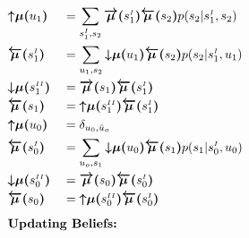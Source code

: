 \documentclass[fleqn]{article}
\begin{document}
\begin{minipage}[t]{0.5\textwidth}
    \begin{alignat}{2}
         & \bm{{\uparrow}{\mu}(}u_1\bm{)}                                      &  & = \sum_{s^{\scriptscriptstyle I}_1, s_2} \bm{\overrightarrow{\mu}(}s^{\scriptscriptstyle I}_1\bm{)} \bm{\overleftarrow{\mu}(}s_2\bm{)} p(s_2|{s^{\scriptscriptstyle I}_1},s_2) \\
         & \bm{\overleftarrow{\mu}(}s^{\scriptscriptstyle I}_1\bm{)}           &  & = \sum_{u_1, s_2} \bm{{\downarrow}{\mu}(}u_1\bm{)} \bm{\overleftarrow{\mu}(}s_2\bm{)} p(s_2|s^{\scriptscriptstyle I}_1,u_1)                                                    \\
         & \bm{{\downarrow}{\mu}(}s^{\scriptscriptstyle II}_1\bm{)}            &  & = \bm{\overrightarrow{\mu}(}s_1\bm{)} \bm{\overleftarrow{\mu}(}s^{\scriptscriptstyle I}_1\bm{)}                                                                                \\
         & \bm{\overleftarrow{\mu}(}s_1\bm{)}                                  &  & = \bm{{\uparrow}{\mu}(}s^{\scriptscriptstyle II}_1\bm{)} \bm{\overleftarrow{\mu}(}s^{\scriptscriptstyle I}_1\bm{)}                                                             \\
         & \bm{{\uparrow}{\mu}(}u_0\bm{)}                                      &  & = \delta_{u_0, \hat{u}_o}                                                                                                                                                      \\
         & \bm{\overleftarrow{\mu}(}s^{\scriptscriptstyle I}_0\bm{)}           &  & = \sum_{u_o, s_1} \bm{{\downarrow}{\mu}(}u_0\bm{)} \bm{\overleftarrow{\mu}(}s_1\bm{)} p(s_1|s^{\scriptscriptstyle I}_0,u_0)                                                    \\
         & \bm{{\downarrow}{\mu}(}s^{\scriptscriptstyle II}_0\bm{)}            &  & = \bm{\overrightarrow{\mu}(}s_0\bm{)} \bm{\overleftarrow{\mu}(}s^{\scriptscriptstyle I}_0\bm{)}                                                                                \\
         & \bm{\overleftarrow{\mu}(}s_0\bm{)}                                  &  & = \bm{{\uparrow}{\mu}(}s^{\scriptscriptstyle II}_0\bm{)} \bm{\overleftarrow{\mu}(}s^{\scriptscriptstyle I}_0\bm{)}                                                             \\[0.5em]
         & \rlap{\text{\bfseries Updating Beliefs:}} \nonumber                                                                                                                                                                                                     \\

\end{alignat}
\end{minipage}
\end{document}
